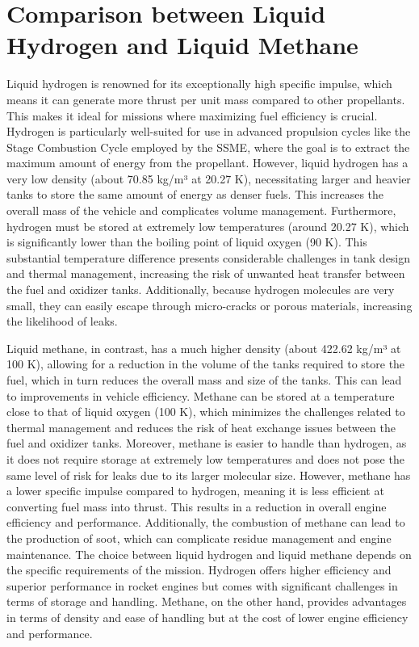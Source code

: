 \section{Comparison between Liquid Hydrogen and Liquid Methane}
Liquid hydrogen is renowned for its exceptionally high specific impulse, which means it can generate more thrust per unit mass compared to other propellants.
This makes it ideal for missions where maximizing fuel efficiency is crucial. 
Hydrogen is particularly well-suited for use in advanced propulsion cycles like the Stage Combustion Cycle employed by the SSME, where the goal is to extract the maximum amount of energy from the propellant.
However, liquid hydrogen has a very low density (about 70.85 kg/m³ at 20.27 K), necessitating larger and heavier tanks to store the same amount of energy as denser fuels.
This increases the overall mass of the vehicle and complicates volume management.
Furthermore, hydrogen must be stored at extremely low temperatures (around 20.27 K), which is significantly lower than the boiling point of liquid oxygen (90 K).
This substantial temperature difference presents considerable challenges in tank design and thermal management, increasing the risk of unwanted heat transfer between the fuel and oxidizer tanks.
Additionally, because hydrogen molecules are very small, they can easily escape through micro-cracks or porous materials, increasing the likelihood of leaks.

Liquid methane, in contrast, has a much higher density (about 422.62 kg/m³ at 100 K), allowing for a reduction in the volume of the tanks required to store the fuel, which in turn reduces the overall mass and size of the tanks.
This can lead to improvements in vehicle efficiency.
Methane can be stored at a temperature close to that of liquid oxygen (100 K), which minimizes the challenges related to thermal management and reduces the risk of heat exchange issues between the fuel and oxidizer tanks.
Moreover, methane is easier to handle than hydrogen, as it does not require storage at extremely low temperatures and does not pose the same level of risk for leaks due to its larger molecular size.
However, methane has a lower specific impulse compared to hydrogen, meaning it is less efficient at converting fuel mass into thrust.
This results in a reduction in overall engine efficiency and performance. Additionally, the combustion of methane can lead to the production of soot, which can complicate residue management and engine maintenance.
The choice between liquid hydrogen and liquid methane depends on the specific requirements of the mission.
Hydrogen offers higher efficiency and superior performance in rocket engines but comes with significant challenges in terms of storage and handling.
Methane, on the other hand, provides advantages in terms of density and ease of handling but at the cost of lower engine efficiency and performance. 

